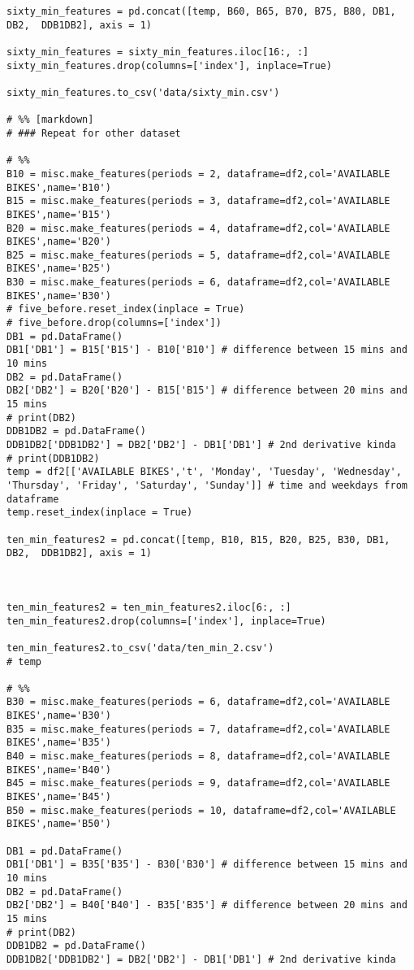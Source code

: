 \begin{verbatim}
sixty_min_features = pd.concat([temp, B60, B65, B70, B75, B80, DB1, DB2,  DDB1DB2], axis = 1)

sixty_min_features = sixty_min_features.iloc[16:, :]
sixty_min_features.drop(columns=['index'], inplace=True)

sixty_min_features.to_csv('data/sixty_min.csv')

# %% [markdown]
# ### Repeat for other dataset

# %%
B10 = misc.make_features(periods = 2, dataframe=df2,col='AVAILABLE BIKES',name='B10')
B15 = misc.make_features(periods = 3, dataframe=df2,col='AVAILABLE BIKES',name='B15')
B20 = misc.make_features(periods = 4, dataframe=df2,col='AVAILABLE BIKES',name='B20')
B25 = misc.make_features(periods = 5, dataframe=df2,col='AVAILABLE BIKES',name='B25')
B30 = misc.make_features(periods = 6, dataframe=df2,col='AVAILABLE BIKES',name='B30')
# five_before.reset_index(inplace = True)
# five_before.drop(columns=['index'])
DB1 = pd.DataFrame()
DB1['DB1'] = B15['B15'] - B10['B10'] # difference between 15 mins and 10 mins
DB2 = pd.DataFrame()
DB2['DB2'] = B20['B20'] - B15['B15'] # difference between 20 mins and 15 mins
# print(DB2)
DDB1DB2 = pd.DataFrame()
DDB1DB2['DDB1DB2'] = DB2['DB2'] - DB1['DB1'] # 2nd derivative kinda
# print(DDB1DB2)
temp = df2[['AVAILABLE BIKES','t', 'Monday', 'Tuesday', 'Wednesday', 'Thursday', 'Friday', 'Saturday', 'Sunday']] # time and weekdays from dataframe
temp.reset_index(inplace = True)

ten_min_features2 = pd.concat([temp, B10, B15, B20, B25, B30, DB1, DB2,  DDB1DB2], axis = 1)



ten_min_features2 = ten_min_features2.iloc[6:, :]
ten_min_features2.drop(columns=['index'], inplace=True)

ten_min_features2.to_csv('data/ten_min_2.csv')
# temp

# %%
B30 = misc.make_features(periods = 6, dataframe=df2,col='AVAILABLE BIKES',name='B30')
B35 = misc.make_features(periods = 7, dataframe=df2,col='AVAILABLE BIKES',name='B35')
B40 = misc.make_features(periods = 8, dataframe=df2,col='AVAILABLE BIKES',name='B40')
B45 = misc.make_features(periods = 9, dataframe=df2,col='AVAILABLE BIKES',name='B45')
B50 = misc.make_features(periods = 10, dataframe=df2,col='AVAILABLE BIKES',name='B50')

DB1 = pd.DataFrame()
DB1['DB1'] = B35['B35'] - B30['B30'] # difference between 15 mins and 10 mins
DB2 = pd.DataFrame()
DB2['DB2'] = B40['B40'] - B35['B35'] # difference between 20 mins and 15 mins
# print(DB2)
DDB1DB2 = pd.DataFrame()
DDB1DB2['DDB1DB2'] = DB2['DB2'] - DB1['DB1'] # 2nd derivative kinda


\end{verbatim}
